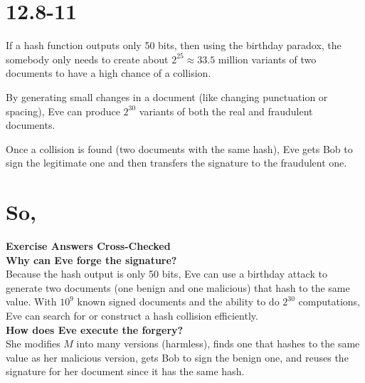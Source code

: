 \documentclass[12pt]{article}
\begin{document}
\section*{12.8-11}


If a hash function outputs only 50 bits, then using the birthday paradox, the somebody only needs to create about \( 2^{25} \approx 33.5 \) million variants of two documents to have a high chance of a collision.

By generating small changes in a document (like changing punctuation or spacing), Eve can produce \( 2^{30} \) variants of both the real and fraudulent documents.

Once a collision is found (two documents with the same hash), Eve gets Bob to sign the legitimate one and then transfers the signature to the fraudulent one.
\section*{So,}
\textbf{Exercise Answers Cross-Checked} \\
\textbf{Why can Eve forge the signature?} \\
Because the hash output is only 50 bits, Eve can use a birthday attack to generate two documents (one benign and one malicious) that hash to the same value. With \( 10^9 \) known signed documents and the ability to do \( 2^{30} \) computations, Eve can search for or construct a hash collision efficiently.\\

\textbf{How does Eve execute the forgery?} \\
She modifies \( M \) into many versions (harmless), finds one that hashes to the same value as her malicious version, gets Bob to sign the benign one, and reuses the signature for her document since it has the same hash.
\end{document}

